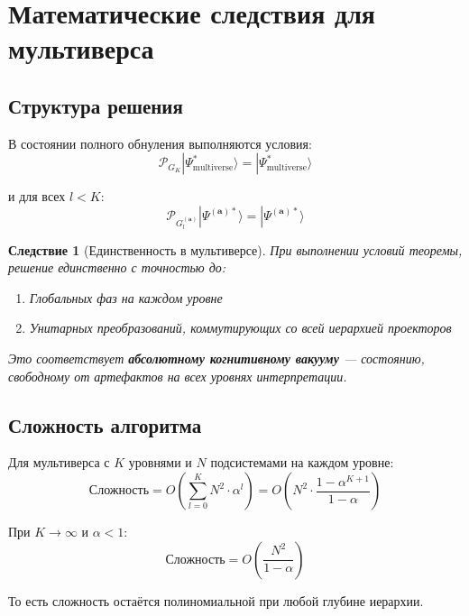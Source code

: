 \documentclass[12pt,a4paper]{article}
\newtheorem{corollary}[theorem]{Следствие}
\newcommand{\ket}[1]{|#1\rangle}
\newcommand{\calP}{\mathcal{P}}
\newcommand{\bfa}{\mathbf{a}}
\begin{document}
\section{Математические следствия для мультиверса}

\subsection{Структура решения}

В состоянии полного обнуления выполняются условия:
\begin{equation}
\calP_{G_K} \ket{\Psi_{\text{multiverse}}^*} = \ket{\Psi_{\text{multiverse}}^*}
\end{equation}

и для всех $l < K$:
\begin{equation}
\calP_{G_l^{(\bfa)}} \ket{\Psi^{(\bfa)*}} = \ket{\Psi^{(\bfa)*}}
\end{equation}

\begin{corollary}[Единственность в мультиверсе]
При выполнении условий теоремы, решение единственно с точностью до:
\begin{enumerate}
    \item Глобальных фаз на каждом уровне
    \item Унитарных преобразований, коммутирующих со всей иерархией проекторов
\end{enumerate}
Это соответствует \textbf{абсолютному когнитивному вакууму} --- состоянию, свободному от артефактов на всех уровнях интерпретации.
\end{corollary}

\subsection{Сложность алгоритма}

Для мультиверса с $K$ уровнями и $N$ подсистемами на каждом уровне:
\begin{equation}
\text{Сложность} = O\left( \sum_{l=0}^K N^2 \cdot \alpha^l \right) = 
O\left( N^2 \cdot \frac{1 - \alpha^{K+1}}{1 - \alpha} \right)
\end{equation}

При $K \to \infty$ и $\alpha < 1$:
\begin{equation}
\text{Сложность} = O\left( \frac{N^2}{1 - \alpha} \right)
\end{equation}

То есть сложность остаётся полиномиальной при любой глубине иерархии.
\end{document}
